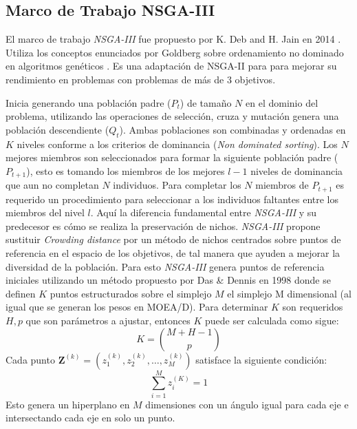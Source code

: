 \documentclass[letterpaper,10pt]{article}
\begin{document}
\subsection{Marco de Trabajo NSGA-III}

El marco de trabajo \emph{NSGA-III} fue propuesto por K. Deb and H. Jain en 2014 \cite{6600851}. Utiliza los conceptos enunciados por Goldberg sobre ordenamiento no dominado en algoritmos genéticos \cite{goldberg1988genetic}. 
Es una adaptación de NSGA-II para para mejorar su rendimiento en problemas con problemas de más de $3$ objetivos.

Inicia generando una población padre ($P_t$) de tamaño $N$ en el dominio del problema, utilizando las operaciones de selección, cruza y mutación genera una población descendiente ($Q_t$).
Ambas poblaciones son combinadas y ordenadas en $K$ niveles conforme a los criterios de dominancia (\textit{Non dominated sorting}). Los $N$ mejores miembros son seleccionados para formar
la siguiente población padre ($P_{t+1}$), esto es tomando los miembros de los mejores $l-1$ niveles de dominancia que aun no completan $N$ individuos. Para completar los $N$ miembros de $P_{t+1}$ es requerido un procedimiento
para seleccionar a los individuos faltantes entre los miembros del nivel $l$. Aquí la diferencia fundamental entre \emph{NSGA-III} y su predecesor es cómo se realiza la preservación de nichos.
\emph{NSGA-III} propone sustituir \textit{Crowding distance} por un método de nichos centrados sobre puntos de referencia en el espacio de los objetivos, de tal manera que ayuden a mejorar la diversidad de la población. Para esto \emph{NSGA-III} genera puntos de referencia
iniciales utilizando un método propuesto por Das \& Dennis en 1998 \cite{Das:1998:NIN:588907.589322} donde se definen $K$ puntos estructurados sobre el simplejo $M$ el simplejo M dimensional (al igual que se generan los pesos en MOEA/D).
Para determinar $K$ son requeridos $H,p$ que son parámetros a ajustar, entonces $K$ puede ser calculada como sigue:
  $$K= {M+H-1 \choose p}$$
Cada punto $\bm{Z}^{(k)}=(z_1^{(k)},z_2^{(k)}, \dots, z_M^{(k)})$ satisface la siguiente condición:
  $$\sum_{i=1}^M z_i^{(K)} = 1$$
Esto genera un hiperplano en $M$ dimensiones con un ángulo igual para cada eje e intersectando cada eje en solo un punto.
\end{document}
